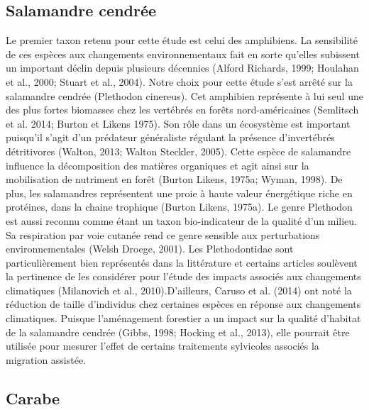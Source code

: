 \subsection*{Salamandre cendrée}

Le premier taxon retenu pour cette étude est celui des amphibiens. 
La sensibilité de ces espèces aux changements environnementaux fait en sorte qu’elles subissent un important déclin depuis plusieurs décennies 
(Alford Richards, 1999; Houlahan et al., 2000; Stuart et al., 2004). Notre choix pour cette étude s’est arrêté sur la salamandre cendrée (Plethodon cinereus). 
Cet amphibien représente à lui seul une des plus fortes biomasses chez les vertébrés en forêts nord-américaines (Semlitsch et al. 2014; Burton et Likens 1975). 
Son rôle dans un écosystème est important puisqu’il s’agit d’un prédateur généraliste régulant la présence d’invertébrés détritivores 
(Walton, 2013; Walton Steckler, 2005). Cette espèce de salamandre influence la décomposition des matières organiques et agit ainsi sur 
la mobilisation de nutriment en forêt (Burton Likens, 1975a; Wyman, 1998). De plus, les salamandres représentent une proie à haute valeur énergétique riche 
en protéines, dans la chaine trophique (Burton Likens, 1975a). Le genre Plethodon est aussi reconnu comme étant un taxon bio-indicateur de la qualité d’un milieu. 
Sa respiration par voie cutanée rend ce genre sensible aux perturbations environnementales (Welsh Droege, 2001). 
Les Plethodontidae sont particulièrement bien représentés dans la littérature et certains articles soulèvent la pertinence de les considérer pour 
l’étude des impacts associés aux changements climatiques (Milanovich et al., 2010).D’ailleurs, Caruso et al. (2014) ont noté la réduction de taille 
d’individus chez certaines espèces en réponse aux changements climatiques. Puisque l’aménagement forestier a un impact sur la qualité d’habitat de la 
salamandre cendrée (Gibbs, 1998; Hocking et al., 2013), elle pourrait être utilisée pour mesurer l’effet de certains traitements sylvicoles associés la 
migration assistée. 


\subsection*{Carabe}

